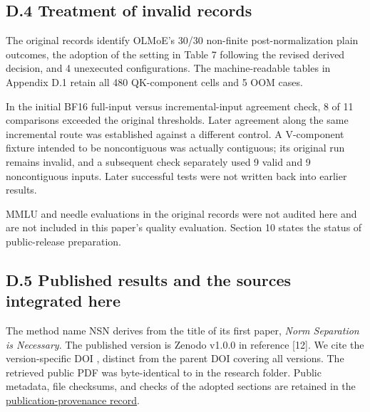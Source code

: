 \documentclass[10pt,a4paper]{article}
\begin{document}
\subsection{D.4 Treatment of invalid records}\label{d.4-treatment-of-invalid-records}

The original records identify OLMoE's 30/30 non-finite post-normalization plain outcomes, the adoption of the setting in Table 7 following the revised derived decision, and 4 unexecuted configurations. The machine-readable tables in Appendix D.1 retain all 480 QK-component cells and 5 OOM cases.

In the initial BF16 full-input versus incremental-input agreement check, 8 of 11 comparisons exceeded the original thresholds. Later agreement along the same incremental route was established against a different control. A V-component fixture intended to be noncontiguous was actually contiguous; its original run remains invalid, and a subsequent check separately used 9 valid and 9 noncontiguous inputs. Later successful tests were not written back into earlier results.

MMLU and needle evaluations in the original records were not audited here and are not included in this paper's quality evaluation. Section 10 states the status of public-release preparation.

\subsection{D.5 Published results and the sources integrated here}\label{d.5-published-results-and-the-sources-integrated-here}

The method name NSN derives from the title of its first paper, \emph{Norm Separation is Necessary}. The published version is Zenodo v1.0.0 in reference {[}12{]}. We cite the version-specific DOI \texttt{}, distinct from the parent DOI covering all versions. The retrieved public PDF was byte-identical to \texttt{} in the research folder. Public metadata, file checksums, and checks of the adopted sections are retained in the \href{https://github.com/metaSATOKEN/nsn/blob/c37d39ea0106274d9f661cfbb268b0ed05319846/metadata/publication-provenance/README.md}{publication-provenance record}.
\end{document}
